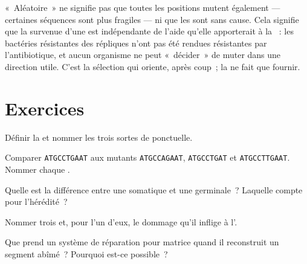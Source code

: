 \begin{remark}\label{rem:g11:mutations:random}
«~Aléatoire~» ne signifie pas que toutes les positions mutent
également --- certaines séquences sont plus fragiles --- ni que les
 sont sans cause. Cela signifie que la survenue d'une 
est indépendante de l'aide qu'elle apporterait à la ~: les
bactéries résistantes des répliques n'ont pas été rendues résistantes
par l'antibiotique, et aucun organisme ne peut «~décider~» de muter
dans une direction utile. C'est la sélection qui oriente, après coup~;
la  ne fait que fournir.
\end{remark}

\section{Exercices}

\begin{exercise}[$\star$]\label{exo:g11:mutations:1}
Définir la  et nommer les trois sortes de  ponctuelle.
\end{exercise}

\begin{exercise}[$\star$]\label{exo:g11:mutations:2}
Comparer \texttt{ATGCCTGAAT} aux mutants \texttt{ATGCCAGAAT},
\texttt{ATGCCTGAT} et \texttt{ATGCCTTGAAT}. Nommer chaque .
\end{exercise}

\begin{exercise}[$\star$]\label{exo:g11:mutations:3}
Quelle est la différence entre une  somatique et une 
germinale~? Laquelle compte pour l'hérédité~?
\end{exercise}

\begin{exercise}[$\star$]\label{exo:g11:mutations:4}
Nommer trois  et, pour l'un d'eux, le dommage qu'il
inflige à l'.
\end{exercise}

\begin{exercise}[$\star$]\label{exo:g11:mutations:5}
Que prend un système de réparation pour matrice quand il reconstruit un
segment abîmé~? Pourquoi est-ce possible~?
\end{exercise}

